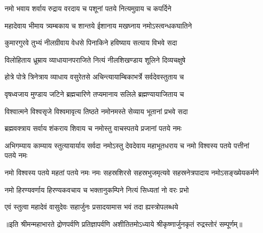 


\addtocounter{shlokacount}{54}

\twolineshloka
{नमो भवाय शर्वाय रुद्राय वरदाय च}
{पशूनां पतये नित्यमुग्राय च कपर्दिने}%

\twolineshloka
{महादेवाय भीमाय त्र्यम्बकाय च शान्तये}
{ईशानाय मखघ्नाय नमोऽस्त्वन्धकघातिने}%

\twolineshloka
{कुमारगुरवे तुभ्यं नीलग्रीवाय वेधसे}
{पिनाकिने हविष्याय सत्याय विभवे सदा}%

\twolineshloka
{विलोहिताय ध्रूम्राय व्याधायानपराजिते}
{नित्यं नीलशिखण्डाय शूलिने दिव्यचक्षुषे}%

\twolineshloka
{होत्रे पोत्रे त्रिनेत्राय व्याधाय वसुरेतसे}
{अचिन्त्यायाम्बिकाभर्त्रे सर्वदेवस्तुताय च}%

\twolineshloka
{वृषध्वजाय मुण्डाय जटिने ब्रह्मचारिणे}
{तप्यमानाय सलिले ब्रह्मण्यायाजिताय च}%

\twolineshloka
{विश्वात्मने विश्वसृजे विश्वमावृत्य तिष्ठते}
{नमोनमस्ते सेव्याय भूतानां प्रभवे सदा}%

\twolineshloka
{ब्रह्मवक्त्राय सर्वाय शंकराय शिवाय च}
{नमोस्तु वाचस्पतये प्रजानां पतये नमः}%

\threelineshloka
{अभिगम्याय काम्याय स्तुत्यायार्याय सर्वदा}
{नमोऽस्तु देवदेवाय महाभूतधराय च}
{नमो विश्वस्य पतये पत्तीनां पतये नमः}%

\threelineshloka
{नमो विश्वस्य पतये महतां पतये नमः}
{नमः सहस्रशिरसे सहस्रभुजमृत्यवे}
{सहस्रनेत्रपादाय नमोऽसङ्ख्येयकर्मणे}%

\twolineshloka
{नमो हिरण्यवर्णाय हिरण्यकवचाय च}
{भक्तानुकम्पिने नित्यं सिध्यतां नो वरः प्रभो}%


\twolineshloka
{एवं स्तुत्वा महादेवं वासुदेवः सहार्जुनः}
{प्रसादयामास भवं तदा ह्यस्त्रोपलब्धये}%

॥इति श्रीमन्महाभारते द्रोणपर्वणि प्रतिज्ञापर्वणि अशीतितमोऽध्याये श्रीकृष्णार्जुनकृतं रुद्रस्तोरं सम्पूर्णम्॥